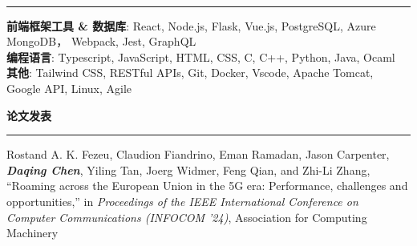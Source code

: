 \documentclass{cv}
\newcommand*{\labelfont}{\fontfamily{bch}\selectfont}
\begin{document}
{}\vspace*{-6pt}\\
\rule{\textwidth}{0.4pt}
{
{\labelfont \textbf{前端框架工具 \& 数据库}}: React, Node.js, Flask, Vue.js, PostgreSQL, Azure MongoDB， Webpack, Jest, GraphQL
\vspace*{1.5pt}\\
{\labelfont \textbf{编程语言}}: Typescript, JavaScript, HTML, CSS, C, C++, Python, Java, Ocaml
\vspace*{1.5pt}\\
{\labelfont \textbf{其他}}: Tailwind CSS, RESTful APIs, Git, Docker, Vscode, Apache Tomcat, Google API, Linux, Agile
}

\vspace*{3pt}
{ {\textbf{论文发表}}}\vspace*{-6pt}\\
\rule{\textwidth}{0.4pt}
Rostand A. K. Fezeu, Claudion Fiandrino, Eman Ramadan, Jason Carpenter,\textit{\textbf{ Daqing Chen}}, Yiling Tan, Joerg Widmer, Feng Qian, and Zhi-Li Zhang, ``Roaming across the European Union in the 5G era: Performance, challenges and opportunities,'' in \textit{Proceedings of the IEEE International Conference on Computer Communications (INFOCOM '24)}, Association for Computing Machinery




\end{document}
